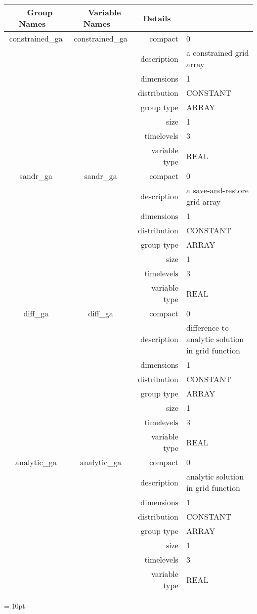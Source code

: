 \begin{tabular*}{150mm}{|c|c@{\extracolsep{\fill}}|rl|} \hline 
~ {\bf Group Names} ~ & ~ {\bf Variable Names} ~  &{\bf Details} ~ & ~ \\ 
\hline 
constrained\_ga & constrained\_ga & compact & 0 \\ 
 &  & description & a constrained grid array \\ 
 &  & dimensions & 1 \\ 
 &  & distribution & CONSTANT \\ 
 &  & group type & ARRAY \\ 
 &  & size & 1 \\ 
 &  & timelevels & 3 \\ 
 &  & variable type & REAL \\ 
\hline 
sandr\_ga & sandr\_ga & compact & 0 \\ 
 &  & description & a save-and-restore grid array \\ 
 &  & dimensions & 1 \\ 
 &  & distribution & CONSTANT \\ 
 &  & group type & ARRAY \\ 
 &  & size & 1 \\ 
 &  & timelevels & 3 \\ 
 &  & variable type & REAL \\ 
\hline 
diff\_ga & diff\_ga & compact & 0 \\ 
 &  & description & difference to analytic solution in grid function \\ 
 &  & dimensions & 1 \\ 
 &  & distribution & CONSTANT \\ 
 &  & group type & ARRAY \\ 
 &  & size & 1 \\ 
 &  & timelevels & 3 \\ 
 &  & variable type & REAL \\ 
\hline 
analytic\_ga & analytic\_ga & compact & 0 \\ 
 &  & description & analytic solution in grid function \\ 
 &  & dimensions & 1 \\ 
 &  & distribution & CONSTANT \\ 
 &  & group type & ARRAY \\ 
 &  & size & 1 \\ 
 &  & timelevels & 3 \\ 
 &  & variable type & REAL \\ 
\hline 
\end{tabular*} 



\vspace{5mm}\parskip = 10pt 
